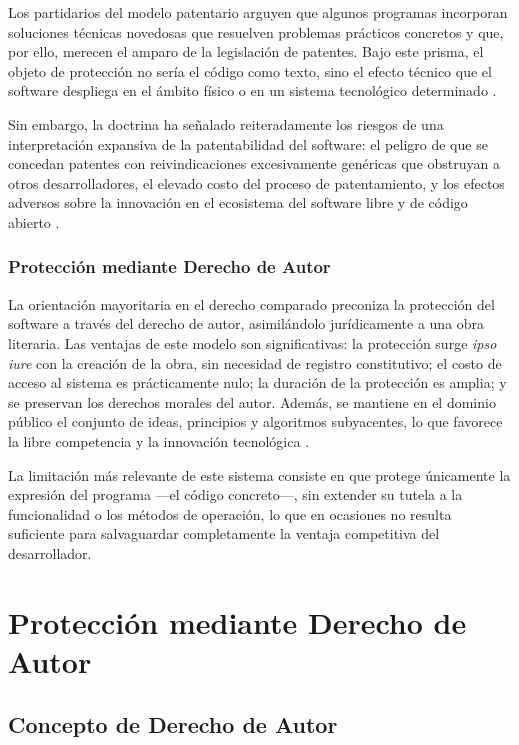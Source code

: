 \documentclass[11pt,a4paper]{report}
\begin{document}
Los partidarios del modelo patentario arguyen que algunos programas incorporan soluciones técnicas novedosas que resuelven problemas prácticos concretos y que, por ello, merecen el amparo de la legislación de patentes. Bajo este prisma, el objeto de protección no sería el código como texto, sino el efecto técnico que el software despliega en el ámbito físico o en un sistema tecnológico determinado \citep{ompi2024}.

Sin embargo, la doctrina ha señalado reiteradamente los riesgos de una interpretación expansiva de la patentabilidad del software: el peligro de que se concedan patentes con reivindicaciones excesivamente genéricas que obstruyan a otros desarrolladores, el elevado costo del proceso de patentamiento, y los efectos adversos sobre la innovación en el ecosistema del software libre y de código abierto \citep{euipo2022}.

\subsection{Protección mediante Derecho de Autor}

La orientación mayoritaria en el derecho comparado preconiza la protección del software a través del derecho de autor, asimilándolo jurídicamente a una obra literaria. Las ventajas de este modelo son significativas: la protección surge \textit{ipso iure} con la creación de la obra, sin necesidad de registro constitutivo; el costo de acceso al sistema es prácticamente nulo; la duración de la protección es amplia; y se preservan los derechos morales del autor. Además, se mantiene en el dominio público el conjunto de ideas, principios y algoritmos subyacentes, lo que favorece la libre competencia y la innovación tecnológica \citep{ompi2024, omc1994}.

La limitación más relevante de este sistema consiste en que protege únicamente la expresión del programa —el código concreto—, sin extender su tutela a la funcionalidad o los métodos de operación, lo que en ocasiones no resulta suficiente para salvaguardar completamente la ventaja competitiva del desarrollador.

\newpage

\chapter{Protección mediante Derecho de Autor}

\section{Concepto de Derecho de Autor}
\end{document}
